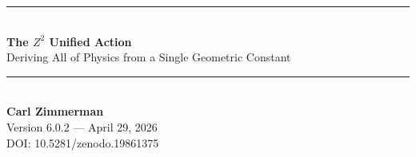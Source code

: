 \documentclass[11pt,a4paper]{article}
\theoremstyle{plain}
\theoremstyle{definition}
\theoremstyle{remark}
\begin{document}

\begin{center}
\rule{\textwidth}{1.5pt}\\[0.5cm]
{\LARGE\bfseries The $Z^2$ Unified Action}\\[0.3cm]
{\Large Deriving All of Physics from a Single Geometric Constant}\\[0.5cm]
\rule{\textwidth}{1.5pt}\\[0.8cm]

{\large\bfseries Carl Zimmerman}\\[0.3cm]
Version 6.0.2 --- April 29, 2026\\[0.3cm]
DOI: 10.5281/zenodo.19861375
\end{center}

\vspace{1cm}

\end{document}
